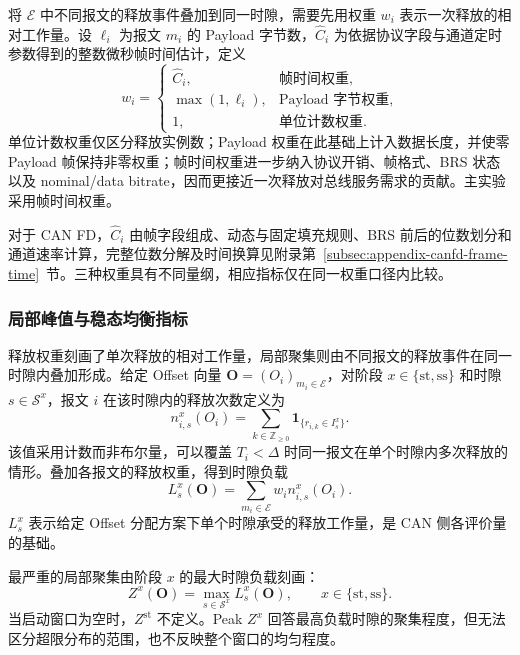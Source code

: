 \documentclass[UTF8,a4paper,twoside,zihao=-4]{ctexart}
\numberwithin{equation}{section}
\numberwithin{figure}{section}
\numberwithin{table}{section}
\theoremstyle{definition}
\newcommand{\ind}[1]{\mathbf{1}_{\{#1\}}}
\newcommand{\Sset}{\mathcal{S}}
\newcommand{\Eset}{\mathcal{E}}
\numberwithin{algocf}{section}
\begin{document}
将 $\Eset$ 中不同报文的释放事件叠加到同一时隙，需要先用权重 $w_i$ 表示一次释放的相对工作量。设 $\ell_i$ 为报文 $m_i$ 的 Payload 字节数，$\widehat C_i$ 为依据协议字段与通道定时参数得到的整数微秒帧时间估计，定义
\begin{equation}
 w_i=
 \begin{cases}
  \widehat C_i, & \text{帧时间权重},\\
  \max(1,\ell_i), & \text{Payload 字节权重},\\
  1, & \text{单位计数权重}.
 \end{cases}
\label{eq:weight-modes}
\end{equation}
单位计数权重仅区分释放实例数；Payload 权重在此基础上计入数据长度，并使零 Payload 帧保持非零权重；帧时间权重进一步纳入协议开销、帧格式、BRS 状态以及 nominal/data bitrate，因而更接近一次释放对总线服务需求的贡献。主实验采用帧时间权重。

对于 CAN FD，$\widehat C_i$ 由帧字段组成、动态与固定填充规则、BRS 前后的位数划分和通道速率计算，完整位数分解及时间换算见附录第~\ref{subsec:appendix-canfd-frame-time}~节。三种权重具有不同量纲，相应指标仅在同一权重口径内比较。

\subsubsection{局部峰值与稳态均衡指标}
\label{subsubsec:slot-load-metrics}

释放权重刻画了单次释放的相对工作量，局部聚集则由不同报文的释放事件在同一时隙内叠加形成。给定 Offset 向量 $\symbf O=(O_i)_{m_i\in\Eset}$，对阶段 $x\in\{\mathrm{st},\mathrm{ss}\}$ 和时隙 $s\in\Sset^x$，报文 $i$ 在该时隙内的释放次数定义为
\begin{equation}
 n_{i,s}^{x}(O_i)
 =\sum_{k\in\mathbb Z_{\ge0}}
 \ind{r_{i,k}\in I_s^x}.
\label{eq:slot-release-count}
\end{equation}
该值采用计数而非布尔量，可以覆盖 $T_i<\Delta$ 时同一报文在单个时隙内多次释放的情形。叠加各报文的释放权重，得到时隙负载
\begin{equation}
 L_s^{x}(\symbf O)
 =\sum_{m_i\in\Eset}w_i n_{i,s}^{x}(O_i).
\label{eq:slot-load-model}
\end{equation}
$L_s^x$ 表示给定 Offset 分配方案下单个时隙承受的释放工作量，是 CAN 侧各评价量的基础。

最严重的局部聚集由阶段 $x$ 的最大时隙负载刻画：
\begin{equation}
 Z^{x}(\symbf O)
 =\max_{s\in\Sset^{x}}L_s^{x}(\symbf O),
 \qquad x\in\{\mathrm{st},\mathrm{ss}\}.
\label{eq:peak-metrics}
\end{equation}
当启动窗口为空时，$Z^{\mathrm{st}}$ 不定义。Peak $Z^x$ 回答最高负载时隙的聚集程度，但无法区分超限分布的范围，也不反映整个窗口的均匀程度。
\end{document}
